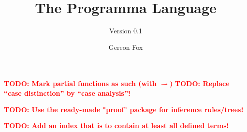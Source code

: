 \documentclass[12pt]{scrreprt}
\title{The Programma Language}
\subtitle{Version 0.1}
\author {Gereon Fox}
\date{}
\newcommand{\todo}[1]{\textcolor{red}  {\textbf{TODO: #1}}}
\begin{document}






\todo{Mark partial functions as such (with $\rightharpoonup$)}
\todo {Replace ``case distinction'' by ``case analysis''!}

\todo {Use the ready-made "proof" package for inference rules/trees!}










	
	
	
\todo{Add an index that is to contain at least all defined terms!}	
	
\end{document}

